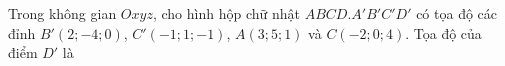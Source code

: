 \begin{ex}
Trong không gian $Oxyz$, cho hình hộp chữ nhật $ABCD.A'B'C'D'$ có tọa độ các đỉnh $B'(2;-4;0)$, $C'(-1;1;-1)$, $A(3;5;1)$ và $C(-2;0;4)$. Tọa độ của điểm $D'$ là
\end{ex}
